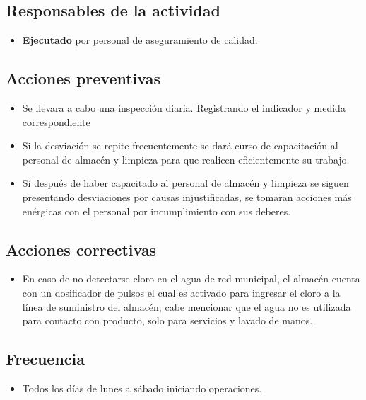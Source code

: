 \subsection{Responsables de la actividad}

\begin{itemize}
	\item \textbf{Ejecutado} por personal de aseguramiento de calidad.
\end{itemize}

\subsection{Acciones preventivas}

\begin{itemize}
	\item Se llevara a cabo una inspección diaria. Registrando el indicador y medida correspondiente
	\item Si la desviación se repite frecuentemente se dará curso de capacitación al personal de almacén y limpieza para que realicen eficientemente su trabajo.
	\item Si después de haber capacitado al personal de almacén y limpieza se siguen presentando desviaciones por causas injustificadas, se tomaran acciones más enérgicas con el personal por incumplimiento con sus deberes.
\end{itemize}

\subsection{Acciones correctivas}

\begin{itemize}
	\item En caso de no detectarse cloro en el agua de red municipal, el almacén cuenta con un dosificador de pulsos el cual es activado para ingresar el cloro a la línea de suministro del almacén; cabe mencionar que el agua no es utilizada para contacto con producto, solo para servicios y lavado de manos.
\end{itemize}

\subsection{Frecuencia}

\begin{itemize}
	\item Todos los días de lunes a sábado iniciando operaciones.
\end{itemize}

